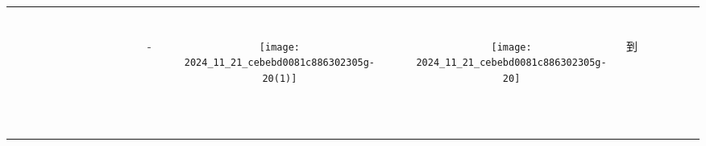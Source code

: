 \documentclass[10pt]{article}
\begin{document}
\begin{center}
\begin{tabular}{|c|c|c|c|c|c|c|c|c|c|c|c|c|c|c|c|c|c|c|c|c|c|c|}
\hline
 &  &  &  &  &  &  &  &  &  &  &  &  &  &  &  &  &  &  &  &  &  &  \\
\hline
 &  &  &  &  &  &  &  &  &  &  &  &  &  &  &  &  &  &  &  &  &  &  \\
\hline
 &  &  &  &  &  &  &  &  &  &  &  &  &  &  &  &  &  &  &  &  &  &  \\
\hline
 &  &  &  &  &  &  &  &  &  &  &  &  &  &  &  &  &  &  &  &  &  &  \\
\hline
 &  &  &  &  &  &  &  &  &  &  &  &  &  &  &  &  &  &  &  &  &  &  \\
\hline
 &  &  &  &  &  &  &  &  &  &  &  &  &  &  &  &  &  &  &  &  &  &  \\
\hline
 &  &  &  &  &  &  &  &  &  &  &  &  &  &  &  &  &  &  &  &  &  &  \\
\hline
 &  &  &  &  &  &  &  &  &  &  &  &  &  &  &  &  &  &  &  &  &  &  \\
\hline
 &  &  &  &  &  &  &  &  &  &  &  & - &  & \texttt{[image: 2024\_11\_21\_cebebd0081c886302305g-20(1)]}
 &  & \texttt{[image: 2024\_11\_21\_cebebd0081c886302305g-20]}
 & 到 &  &  &  &  &  \\
\hline
 &  &  &  &  &  &  &  &  &  &  &  &  &  &  &  &  &  &  &  &  &  &  \\
\hline
 &  &  &  &  &  &  &  &  &  &  &  &  &  &  &  &  &  &  &  &  &  &  \\
\hline
 &  &  &  &  &  &  &  &  &  &  &  &  &  &  &  &  &  &  &  &  &  &  \\
\hline
 &  &  &  &  &  &  &  &  &  &  &  &  &  &  &  &  &  &  &  &  &  &  \\
\hline
 &  &  &  &  &  &  &  &  &  &  &  &  &  &  &  &  &  &  &  &  &  &  \\
\hline
 &  &  &  &  &  &  &  &  &  &  &  &  &  &  &  &  &  &  &  &  &  &  \\
\hline
 &  &  &  &  &  &  &  &  &  &  &  &  &  &  &  &  &  &  &  &  &  &  \\
\hline
 &  &  &  &  &  &  &  &  &  &  &  &  &  &  &  &  &  &  &  &  &  &  \\
\hline
 &  &  &  &  &  &  &  &  &  &  &  &  &  &  &  &  &  &  &  &  &  &  \\
\hline
 &  &  &  &  &  &  &  &  &  &  &  &  &  &  &  &  &  &  &  &  &  &  \\
\hline
 &  &  &  &  &  &  &  &  &  &  &  &  &  &  &  &  &  &  &  &  &  &  \\
\hline
 &  &  &  &  &  &  &  &  &  &  &  &  &  &  &  &  &  &  &  &  &  &  \\

\end{tabular}
\end{center}
\end{document}

